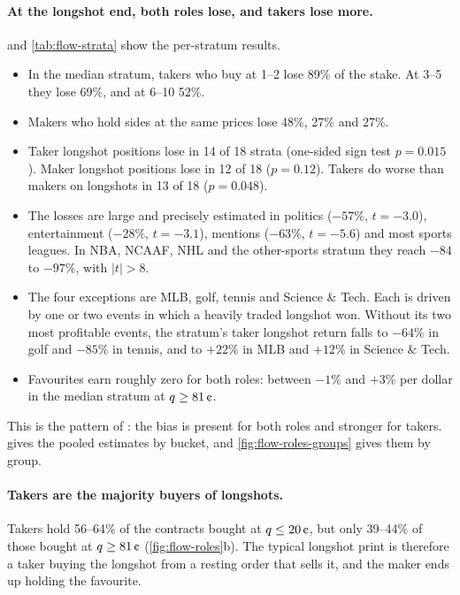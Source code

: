 \paragraph{At the longshot end, both roles lose, and takers lose more.} 
and \cref{tab:flow-strata} show the per-stratum results.
\begin{itemize}
  \item In the median stratum, takers who buy at 1--2\cents{} lose 89\% of the stake. At
  3--5\cents{} they lose 69\%, and at 6--10\cents{} 52\%.
  \item Makers who hold sides at the same prices lose 48\%, 27\% and 27\%.
  \item Taker longshot positions lose in 14 of 18 strata (one-sided sign test $p=0.015$). Maker
  longshot positions lose in 12 of 18 ($p=0.12$). Takers do worse than makers on longshots in 13
  of 18 ($p=0.048$).
  \item The losses are large and precisely estimated in politics ($-57\%$, $t=-3.0$),
  entertainment ($-28\%$, $t=-3.1$), mentions ($-63\%$, $t=-5.6$) and most sports leagues. In
  NBA, NCAAF, NHL and the other-sports stratum they reach $-84$ to $-97\%$, with $|t|>8$.
  \item The four exceptions are MLB, golf, tennis and Science \& Tech. Each is driven by one or
  two events in which a heavily traded longshot won. Without its two most profitable events,
  the stratum's taker longshot return falls to $-64\%$ in golf and $-85\%$ in tennis, and to
  $+22\%$ in MLB and $+12\%$ in Science \& Tech.
  \item Favourites earn roughly zero for both roles: between $-1\%$ and $+3\%$ per dollar in the
  median stratum at $\q\ge81\cents$.
\end{itemize}
This is the pattern of \citet{burgi2025}: the bias is present for both roles and stronger for
takers.  gives the pooled estimates by bucket, and
\cref{fig:flow-roles-groups} gives them by group.

\paragraph{Takers are the majority buyers of longshots.} Takers hold 56--64\% of the contracts
bought at $\q\le20\cents$, but only 39--44\% of those bought at $\q\ge81\cents$
(\cref{fig:flow-roles}b). The typical longshot print is therefore a taker buying the longshot
from a resting order that sells it, and the maker ends up holding the favourite.

